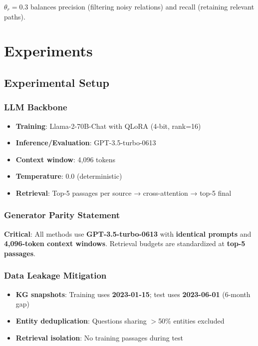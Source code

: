 \documentclass[10pt,twocolumn]{article}
\begin{document}
$\theta_r=0.3$ balances precision (filtering noisy relations) and recall (retaining relevant paths).


\section{Experiments}
\label{sec:experiments}

\subsection{Experimental Setup}

\subsubsection{LLM Backbone}
\begin{itemize}
    \item \textbf{Training}: Llama-2-70B-Chat with QLoRA (4-bit, rank=16)
    \item \textbf{Inference/Evaluation}: GPT-3.5-turbo-0613
    \item \textbf{Context window}: 4,096 tokens
    \item \textbf{Temperature}: 0.0 (deterministic)
    \item \textbf{Retrieval}: Top-5 passages per source → cross-attention → top-5 final
\end{itemize}

\subsubsection{Generator Parity Statement}
\label{sec:generator_parity}

\textbf{Critical}: All methods use \textbf{GPT-3.5-turbo-0613} with \textbf{identical prompts} and \textbf{4,096-token context windows}. Retrieval budgets are standardized at \textbf{top-5 passages}.

\subsubsection{Data Leakage Mitigation}
\label{sec:leakage}
\begin{itemize}
    \item \textbf{KG snapshots}: Training uses \textbf{2023-01-15}; test uses \textbf{2023-06-01} (6-month gap)
    \item \textbf{Entity deduplication}: Questions sharing $>$50\% entities excluded
    \item \textbf{Retrieval isolation}: No training passages during test
\end{itemize}
\end{document}
